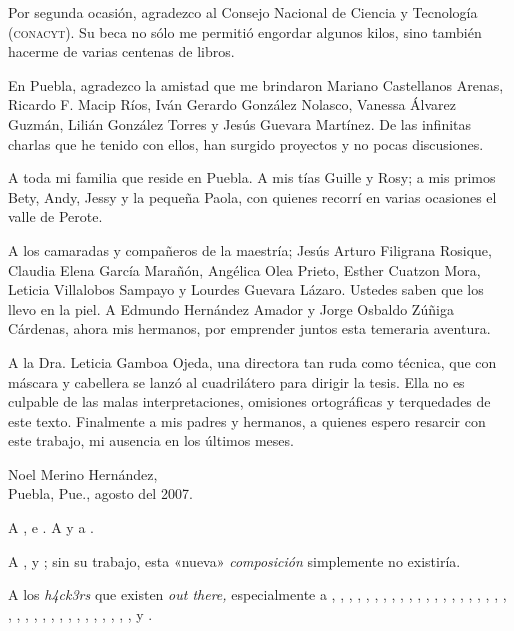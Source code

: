 \documentclass[14pt,twoside,final]{extbook} %
\begin{document}
Por segunda ocasión, agradezco al Consejo Nacional de Ciencia y Tecnología (\textsc{conacyt}). Su beca no sólo me permitió engordar algunos kilos, sino también hacerme de varias centenas de libros.

En Puebla, agradezco la amistad que me brindaron Mariano Castellanos Arenas, Ricardo F. Macip Ríos, Iván Gerardo González Nolasco, Vanessa Álvarez Guzmán, Lilián González Torres y Jesús Guevara Martínez. De las infinitas charlas que he tenido con ellos, han surgido proyectos y no pocas discusiones.

A toda mi familia que reside en Puebla. A mis tías Guille y Rosy; a mis primos Bety, Andy, Jessy y la pequeña Paola, con quienes recorrí en varias ocasiones el valle de Perote.

A los camaradas y compañeros de la maestría; Jesús Arturo Filigrana Rosique, Claudia Elena García Marañón, Angélica Olea Prieto, Esther Cuatzon Mora, Leticia Villalobos Sampayo y Lourdes Guevara Lázaro. Ustedes saben que los llevo en la piel. A Edmundo Hernández Amador y Jorge Osbaldo Zúñiga Cárdenas, ahora mis hermanos, por emprender juntos esta temeraria aventura.

A la Dra. Leticia Gamboa Ojeda, una directora tan ruda como técnica, que con máscara y cabellera se lanzó al cuadrilátero para dirigir la tesis. Ella no es culpable de las malas interpretaciones, omisiones ortográficas y terquedades de este texto. Finalmente a mis padres y hermanos, a quienes espero resarcir con este trabajo, mi ausencia en los últimos meses.
\bigskip
\begin{flushright}
Noel Merino Hernández, \\ Puebla, Pue., agosto del 2007.
\end{flushright}
A ,  e .\textsuperscript{\selectfont{}} A  y a .

A ,  y ; sin su trabajo, esta «nueva» \emph{composición} simplemente no existiría.

A los \emph{h4ck3rs} que existen \emph{out there,} especialmente a , ,\textsuperscript{\selectfont{}} ,\textsuperscript{\selectfont{}} , , , , , ,\textsuperscript{\selectfont{}} , , , , , , , , , , , , , , , , , , , , , , , , , , ,  y .
\end{document}
